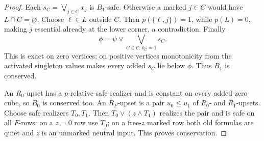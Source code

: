 \begin{proof}
Each $s_C=\bigvee_{j\in C}x_j$ is $B_1$-safe. Otherwise a marked
$j\in C$ would have $L\cap C=\varnothing$. Choose $\ell\in L$ outside
$C$. Then $p(\{\ell,j\})=1$, while $p(L)=0$, making $j$ essential
already at the lower corner, a contradiction. Finally
\[
 \phi=\psi\lor\bigvee_{C\in\mathcal C:\,b_C=1}s_C.
\]
This is exact on zero vertices; on positive vertices monotonicity from
the activated singleton values makes every added $s_C$ lie below $\phi$.
Thus $B_1$ is conserved.

An $R_0$-upset has a $p$-relative-safe realizer and is constant on every
added zero cube, so $B_0$ is conserved too. An $R_F$-upset is a pair
$u_0\leq u_1$ of $R_0$- and $R_1$-upsets. Choose safe realizers
$T_0,T_1$. Then $T_0\lor(z\land T_1)$ realizes the pair and is safe on
all $F$-rows: on a $z=0$ row use $T_0$; on a free-$z$ marked row both
old formulas are quiet and $z$ is an unmarked neutral input. This proves
conservation.
\end{proof}

